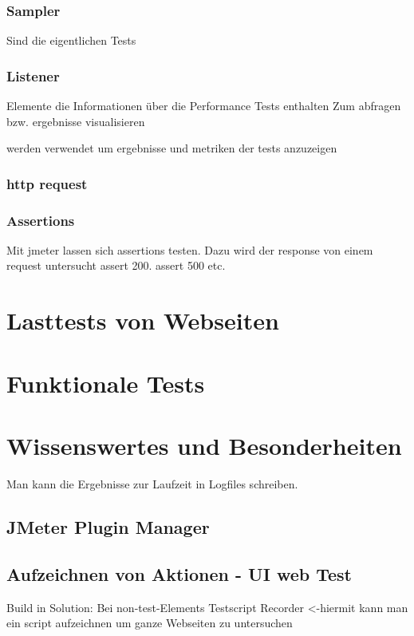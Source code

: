 \documentclass[a4paper,12pt]{article}
\begin{document}
\subsubsection{Sampler}
Sind die eigentlichen Tests
\subsubsection{Listener}
Elemente die Informationen über die Performance Tests enthalten
Zum abfragen bzw. ergebnisse visualisieren

werden verwendet um ergebnisse und metriken der tests anzuzeigen

\subsubsection{http request}
\subsubsection{Assertions}
Mit jmeter lassen sich assertions testen. Dazu wird der response von einem request untersucht assert 200. assert 500 etc.

\section{Lasttests von Webseiten}

\section{Funktionale Tests}

\section{Wissenswertes und Besonderheiten}
Man kann die Ergebnisse zur Laufzeit in Logfiles schreiben.

\subsection{JMeter Plugin Manager}



\subsection{Aufzeichnen von Aktionen - UI web Test}
Build in Solution:
Bei non-test-Elements Testscript Recorder <-hiermit kann man ein script aufzeichnen um ganze Webseiten zu untersuchen
\end{document}
